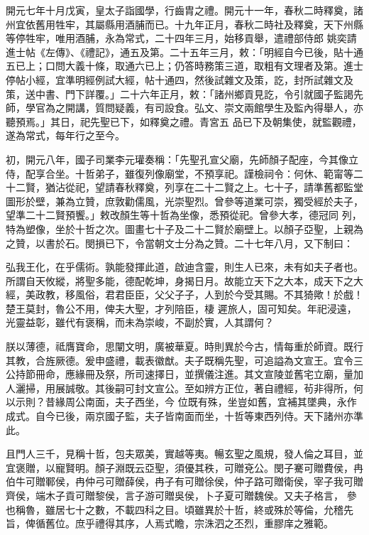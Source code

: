 \begin{pinyinscope}
 開元七年十月戊寅，皇太子詣國學，行齒胄之禮。開元十一年，春秋二時釋奠，諸州宜依舊用牲牢，其屬縣用酒脯而已。十九年正月，春秋二時社及釋奠，天下州縣等停牲牢，唯用酒脯，永為常式，二十四年三月，始移貢舉，遣禮部侍郎
 姚奕請進士帖《左傳》、《禮記》，通五及第。二十五年三月，敕：「明經自今已後，貼十通五已上；口問大義十條，取通六已上；仍答時務策三道，取粗有文理者及第。進士停帖小經，宜準明經例試大經，帖十通四，然後試雜文及策，訖，封所試雜文及策，送中書、門下詳覆。」二十六年正月，敕：「諸州鄉貢見訖，令引就國子監謁先師，學官為之開講，質問疑義，有司設食。弘文、崇文兩館學生及監內得舉人，亦聽預焉。」其日，祀先聖已下，如釋奠之禮。青宮五
 品已下及朝集使，就監觀禮，遂為常式，每年行之至今。



 初，開元八年，國子司業李元瓘奏稱：「先聖孔宣父廟，先師顏子配座，今其像立侍，配享合坐。十哲弟子，雖復列像廟堂，不預享祀。謹檢祠令：何休、範甯等二十二賢，猶沾從祀，望請春秋釋奠，列享在二十二賢之上。七十子，請準舊都監堂圖形於壁，兼為立贊，庶敦勸儒風，光崇聖烈。曾參等道業可崇，獨受經於夫子，望準二十二賢預饗。」敕改顏生等十哲為坐像，悉預從祀。曾參大孝，德冠同
 列，特為塑像，坐於十哲之次。圖畫七十子及二十二賢於廟壁上。以顏子亞聖，上親為之贊，以書於石。閔損已下，令當朝文士分為之贊。二十七年八月，又下制曰：



 弘我王化，在乎儒術。孰能發揮此道，啟迪含靈，則生人已來，未有如夫子者也。所謂自天攸縱，將聖多能，德配乾坤，身揭日月。故能立天下之大本，成天下之大經，美政教，移風俗，君君臣臣，父父子子，人到於今受其賜。不其猗歟！於戲！楚王莫封，魯公不用，俾夫大聖，才列陪臣，棲
 遲旅人，固可知矣。年祀浸遠，光靈益彰，雖代有褒稱，而未為崇峻，不副於實，人其謂何？



 朕以薄德，祗膺寶命，思闡文明，廣被華夏。時則異於今古，情每重於師資。既行其教，合旌厥德。爰申盛禮，載表徽猷。夫子既稱先聖，可追謚為文宣王。宜令三公持節冊命，應緣冊及祭，所司速擇日，並撰儀注進。其文宣陵並舊宅立廟，量加人灑掃，用展誠敬。其後嗣可封文宣公。至如辨方正位，著自禮經，茍非得所，何以示則？昔緣周公南面，夫子西坐，今
 位既有殊，坐豈如舊，宜補其墜典，永作成式。自今已後，兩京國子監，夫子皆南面而坐，十哲等東西列侍。天下諸州亦準此。



 且門人三千，見稱十哲，包夫眾美，實越等夷。暢玄聖之風規，發人倫之耳目，並宜褒贈，以寵賢明。顏子淵既云亞聖，須優其秩，可贈兗公。閔子騫可贈費侯，冉伯牛可贈鄆侯，冉仲弓可贈薛侯，冉子有可贈徐侯，仲子路可贈衛侯，宰子我可贈齊侯，端木子貢可贈黎侯，言子游可贈吳侯，卜子夏可贈魏侯。又夫子格言，
 參也稱魯，雖居七十之數，不載四科之目。頃雖異於十哲，終或殊於等倫，允稽先旨，俾循舊位。庶乎禮得其序，人焉式瞻，宗洙泗之丕烈，重膠庠之雅範。




\end{pinyinscope}
